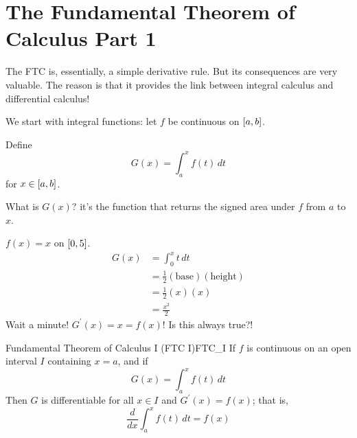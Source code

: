 \section{The Fundamental Theorem of Calculus Part 1}
The FTC is, essentially, a simple derivative rule. But
its consequences are very valuable. The reason is that it
provides the link between integral calculus and
differential calculus!

We start with integral functions: let $ f $ be
continuous on $ \interval{a}{b} $.

Define
\[ G(x)=\int_{a}^{x} f(t)\, d{t}  \]
for $ x\in\interval{a}{b} $.

What is $ G(x) $? it's the function that returns the signed
area under $ f $ from $ a $ to $ x $.

\begin{Example}{}{}
    $ f(x)=x $ on $ \interval{0}{5} $.
    \begin{align*}
        G(x)
         & =\int_{0}^{x} t\, d{t}                   \\
         & =\frac{1}{2}(\text{base})(\text{height}) \\
         & =\frac{1}{2}(x)(x)                       \\
         & =\frac{x^2}{2}
    \end{align*}
    Wait a minute! $ G^\prime(x)=x=f(x) $! Is this always true?!
\end{Example}

\begin{Theorem}{Fundamental Theorem of Calculus I (FTC I)}{FTC_I}
    If $ f $ is continuous on an open interval $ I $ containing
    $ x=a $, and if
    \[ G(x)=\int_{a}^{x} f(t)\, d{t}  \]
    Then $ G $ is differentiable for all $ x\in I $ and
    $ G^\prime(x)=f(x) $; that is,
    \[ \frac{d}{dx}\int_{a}^{x} f(t)\, d{t}=f(x) \]
\end{Theorem}


